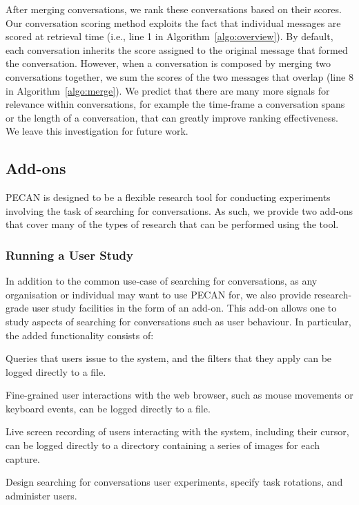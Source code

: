 After merging conversations, we rank these conversations based on their scores. Our conversation scoring method exploits the fact that individual messages are scored at retrieval time (i.e., line 1 in Algorithm~\ref{algo:overview}). By default, each conversation inherits the score assigned to the original message that formed the conversation. However, when a conversation is composed by merging two conversations together, we sum the scores of the two messages that overlap (line 8 in Algorithm~\ref{algo:merge}). We predict that there are many more signals for relevance within conversations, for example the time-frame a conversation spans or the length of a conversation, that can greatly improve ranking effectiveness. We leave this investigation for future work.

\vspace{-8pt}
\subsection{Add-ons}

PECAN is designed to be a flexible research tool for conducting experiments involving the task of searching for conversations. As such, we provide two add-ons that cover many of the types of research that can be performed using the tool.

\subsubsection{Running a User Study}

In addition to the common use-case of searching for conversations, as any organisation or individual may want to use PECAN for, we also provide research-grade user study facilities in the form of an add-on. This add-on allows one to study aspects of searching for conversations such as user behaviour. In particular, the added functionality consists of:
\begin{description}[noitemsep, leftmargin=8pt]
\item[Query Logging.] Queries that users issue to the system, and the filters that they apply can be logged directly to a file. 
\item[Interaction Logging.] Fine-grained user interactions with the web browser, such as mouse movements or keyboard events, can be logged directly to a file.
\item[Screen Recording.] Live screen recording of users interacting with the system, including their cursor, can be logged directly to a directory containing a series of images for each capture.
\item[Administration.] Design searching for conversations user experiments, specify task rotations, and administer users.
\end{description}

